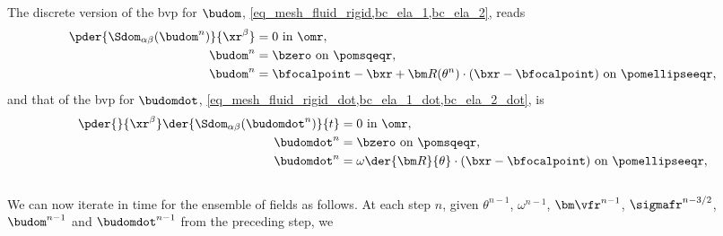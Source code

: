 The discrete version of  the \ac{bvp} for $\budom$, \cref{eq_mesh_fluid_rigid,bc_ela_1,bc_ela_2}, reads
\begin{align}
    \label{eq_domain_fluid_rigid_disc}
    \pder{\Sdom_{\alpha \beta}(\budom^n)}{\xr^\beta} & = 0 \text{ in } \omr,                                                                            \\
    \label{bc_ela_1_disc}
    \budom^n                                         & =\bzero \text{ on } \pomsqeqr,                                                                   \\
    \label{bc_ela_2_disc}
    \budom^n                                         & = \bfocalpoint - \bxr + {\bm R}(\theta^n)\cdot (\bxr - \bfocalpoint) \text{ on } \pomellipseeqr,
\end{align}
and that of the \ac{bvp} for $\budomdot$, \cref{eq_mesh_fluid_rigid_dot,bc_ela_1_dot,bc_ela_2_dot}, is
\begin{align}
    \label{eq_domain_fluid_rigid_disc_dot}
    \pder{}{\xr^\beta}\der{\Sdom_{\alpha \beta}(\budomdot^n)}{t} & = 0 \text{ in } \omr,                                                                  \\
    \label{bc_ela_1_disc_dot}
    \budomdot  ^n                                                & =\bzero \text{ on } \pomsqeqr,                                                         \\
    \label{bc_ela_2_disc_dot}
    \budomdot  ^n                                                & =  \omega \der{{\bm R}}{\theta}\cdot (\bxr - \bfocalpoint) \text{ on } \pomellipseeqr,
\end{align}\vspace{0.5cm}\\

We can now iterate in time for the ensemble of fields as follows. At each step $n$, given $\theta^{n-1}$, $\omega^{n-1}$, ${\bm \vfr}^{n-1}$, $\sigmafr^{n-3/2}$, $\budom^{n-1}$ and $\budomdot^{n-1}$ from the preceding step, we
\begin{enumerate}
\end{enumerate}


